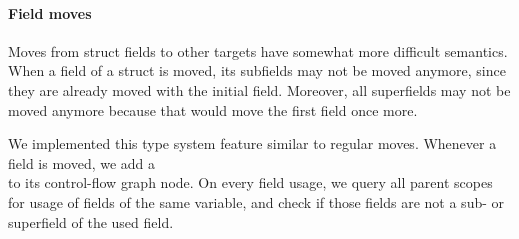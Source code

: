 \paragraph{Field moves}

Moves from struct fields to other targets have somewhat more difficult semantics. When a field of a struct is moved, its subfields may not be moved anymore, since they are already moved with the initial field. Moreover, all superfields may not be moved anymore because that would move the first field once more. 

We implemented this type system feature similar to regular moves. Whenever a field is moved, we add a\\  to its control-flow graph node. On every field usage, we query all parent scopes for usage of fields of the same variable, and check if those fields are not a sub- or superfield of the used field.

